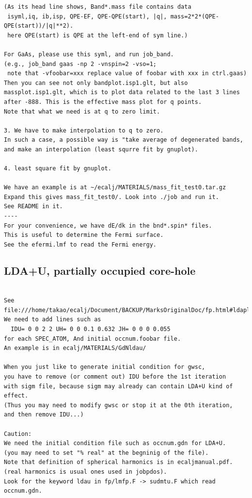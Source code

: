 \begin{verbatim}
(As its head line shows, Band*.mass file contains data
 isyml,iq, ib,isp, QPE-EF, QPE-QPE(start), |q|, mass=2*2*(QPE-QPE(start))/|q|**2).
 here QPE(start) is QPE at the left-end of sym line.)

For GaAs, please use this syml, and run job_band.
(e.g., job_band gaas -np 2 -vnspin=2 -vso=1; 
 note that -vfoobar=xxx replace value of foobar with xxx in ctrl.gaas)
Then you can see not only bandplot.isp1.glt, but also
massplot.isp1.glt, which is to plot data related to the last 3 lines
after -888. This is the effective mass plot for q points.
Note that what we need is at q to zero limit.

3. We have to make interpolation to q to zero.
In such a case, a possible way is "take average of degenerated bands,
and make an interpolation (least squrre fit by gnuplot).

4. least square fit by gnuplot. 

We have an example is at ~/ecalj/MATERIALS/mass_fit_test0.tar.gz
Expand this gives mass_fit_test0/. Look into ./job and run it. 
See README in it.
----
For your convenience, we have dE/dk in the bnd*.spin* files.
This is useful to determine the Fermi surface.
See the efermi.lmf to read the Fermi energy.

\end{verbatim}

\subsection{LDA+U, partially occupied core-hole}

\begin{verbatim}

See
file:///home/takao/ecalj/Document/BACKUP/MarksOriginalDoc/fp.html#ldaplusu
We need to add lines such as
  IDU= 0 0 2 2 UH= 0 0 0.1 0.632 JH= 0 0 0 0.055
for each SPEC_ATOM, And initial occnum.foobar file.
An example is in ecalj/MATERIALS/GdNldau/

When you just like to generate initial condition for gwsc,
you have to remove (or comment out) IDU before the 1st iteration
with sigm file, because sigm may already can contain LDA+U kind of effect.
(Thus you may need to modify gwsc or stop it at the 0th iteration,
and then remove IDU...)

Caution: 
We need the initial condition file such as occnum.gdn for LDA+U. 
(you may need to set "% real" at the begninig of the file).
Note that definition of spherical harmonics is in ecaljmanual.pdf.
(real harmonics is usual ones used in jobpdos).
Look for the keyword ldau in fp/lmfp.F -> sudmtu.F which read occnum.gdn.

\end{verbatim}


